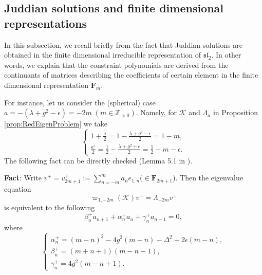\documentclass[11pt]{article}
\numberwithin{equation}{section}
\newcommand{\Z}{\mathbb{Z}} %
\theoremstyle{plain}
\theoremstyle{definition}
\theoremstyle{remark}
\begin{document}
\subsection{Juddian solutions and finite dimensional representations}
\label{sec:judd-solut-finite}

  In this subsection,  we recall briefly from \cite{W2016JPA} the fact that Juddian solutions are obtained in the finite dimensional irreducible representation of $\mathfrak{sl}_2$. In other words, we explain that the constraint polynomials are derived from the continuants of matrices describing the coefficients of certain element in the finite dimensional representation \(\mathbf{F}_{m}\).
 
For instance, let us consider the (spherical) case $a=-(\lambda+g^2-\epsilon)=-2m\; (m\in \Z_{>0})$. Namely, for $\mathcal{K}$ and $\Lambda_a$ in Proposition \ref{prop:RedEigenProblem} we take 
\begin{equation*}
\begin{cases}
1 + \frac{a}2= 1 -  \frac{\lambda+g^2-\epsilon}2=1-m,\\
\frac{a'}2=\frac12- \frac{\lambda+g^2+\epsilon}2=\frac12-m-\epsilon.
\end{cases} 
\end{equation*}
The following fact can be directly checked (Lemma 5.1 in \cite{W2016JPA}). 
\smallskip

\noindent
{\bf Fact}:  Write  $v^+=v^+_{2m+1}:= \sum_{n=-m}^{m} a_n e_{1,n} (\in \mathbf{F}_{2m+1}$). 
Then the eigenvalue equation 
$$\varpi_{1,-2m}(\mathcal{K})v^+=\Lambda_{-2m}v^+$$ 
is equivalent to the following
$$
\beta_n^+ a_{n+1} +\alpha_n^+ a_n + \gamma_n^+ a_{n-1}=0,
$$
where
\begin{equation*}
\begin{cases}
\alpha_n^+= (m-n)^2-4g^2(m-n)-\Delta^2+2\epsilon(m-n),\\
\beta_n^+=(m+n+1)(m-n-1),\\
\gamma_n^+=4g^2(m-n+1).
\end{cases}
\end{equation*}
\end{document}
